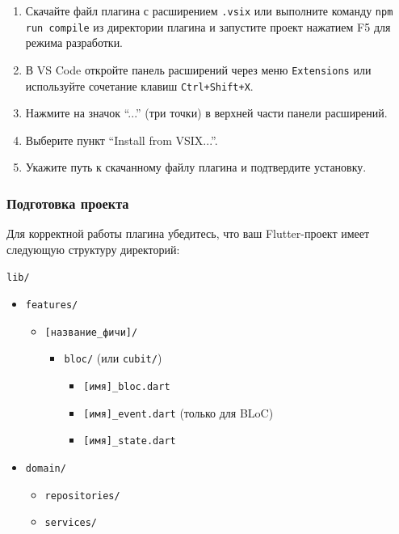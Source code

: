 \documentclass[14pt, russian]{scrartcl}
\newcommand{\enq}[1]{\enquote{#1}}
\begin{document}
\begin{enumerate}
    \item Скачайте файл плагина с расширением \texttt{.vsix} или выполните команду \texttt{npm run compile} из директории плагина и запустите проект нажатием F5 для режима разработки.
    \item В VS Code откройте панель расширений через меню \texttt{Extensions} или используйте сочетание клавиш \texttt{Ctrl+Shift+X}.
    \item Нажмите на значок \enq{...} (три точки) в верхней части панели расширений.
    \item Выберите пункт \enq{Install from VSIX...}.
    \item Укажите путь к скачанному файлу плагина и подтвердите установку.
\end{enumerate}

\subsubsection{Подготовка проекта}

Для корректной работы плагина убедитесь, что ваш Flutter-проект имеет следующую структуру директорий:

\texttt{lib/}
\begin{itemize}
    \item \texttt{features/}
    \begin{itemize}
        \item \texttt{[название\_фичи]/}
        \begin{itemize}
            \item \texttt{bloc/} (или \texttt{cubit/})
            \begin{itemize}
                \item \texttt{[имя]\_bloc.dart}
                \item \texttt{[имя]\_event.dart} (только для BLoC)
                \item \texttt{[имя]\_state.dart}
            \end{itemize}
        \end{itemize}
    \end{itemize}
    \item \texttt{domain/}
    \begin{itemize}
        \item \texttt{repositories/}
        \item \texttt{services/}
    \end{itemize}
\end{itemize}
\end{document}
